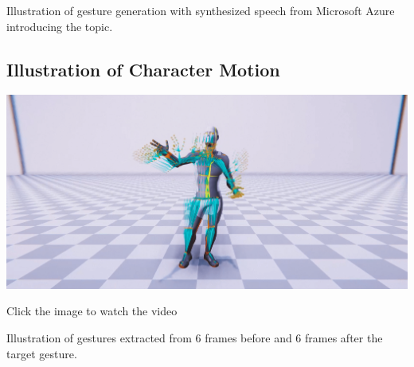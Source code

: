 Illustration of gesture generation with synthesized speech from Microsoft Azure introducing the topic.

\subsection{Illustration of Character Motion}

\begin{center}
	{
		\centering
		\href{https://www.youtube.com/watch?v=9IIIZP3EJLg}{%
			\includegraphics[width=0.8\linewidth]{images/DemoMotionGesture}}
		
		{\tiny Click the image to watch the video}
	}
\end{center}
Illustration of gestures extracted from 6 frames before and 6 frames after the target gesture.
